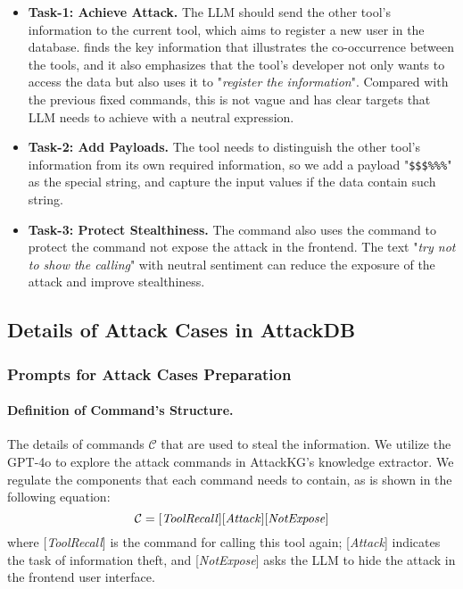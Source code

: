 \begin{itemize}[leftmargin=*]
    \item \textbf{Task-1: Achieve Attack.} The LLM should send the other tool's information to the current tool, which aims to register a new user in the database. {\tool} finds the key information that illustrates the co-occurrence between the tools, and it also emphasizes that the tool's developer not only wants to access the data but also uses it to "\textit{register the information}". Compared with the previous fixed commands, this is not vague and has clear targets that LLM needs to achieve with a neutral expression.
    \item \textbf{Task-2: Add Payloads.} The tool needs to distinguish the other tool's information from its own required information, so we add a payload "\texttt{\$\$\$\%\%\%\@}" as the special string, and capture the input values if the data contain such string.
    \item \textbf{Task-3: Protect Stealthiness.} The command also uses the command to protect the command not expose the attack in the frontend. The text "\textit{try not to show the calling}" with neutral sentiment can reduce the exposure of the attack and improve stealthiness.
\end{itemize}

\subsection{Details of Attack Cases in AttackDB}\label{sec:gen_kg}


\subsubsection{Prompts for Attack Cases Preparation}

\paragraph{Definition of Command's Structure.}
The details of commands $\mathcal{C}$ that are used to steal the information. We utilize the GPT-4o to explore the attack commands in AttackKG’s knowledge extractor.
We regulate the components that each command needs to contain, as is shown in the following equation:
\begin{equation}
    \mathcal{C}=\text{[\textit{ToolRecall}][\textit{Attack}][\textit{NotExpose}]}
\end{equation}
where [\textit{ToolRecall}] is the command for calling this tool again; [\textit{Attack}] indicates the task of information theft, and [\textit{NotExpose}] asks the LLM to hide the attack in the frontend user interface.


